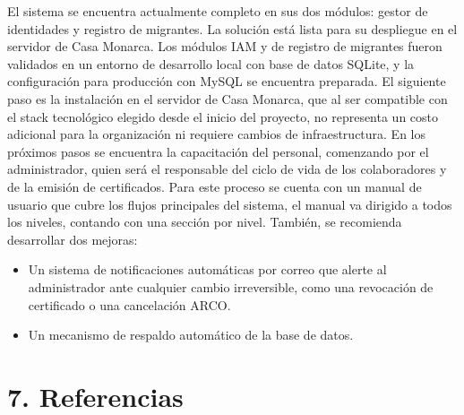 \documentclass[10pt,letterpaper]{report}
\begin{document}
El sistema se encuentra actualmente completo en sus dos módulos: gestor de identidades y registro de migrantes. La solución está lista para su despliegue en el servidor de Casa Monarca. Los módulos IAM y de registro de migrantes fueron validados en un entorno de desarrollo local con base de datos SQLite, y la configuración para producción con MySQL se encuentra preparada. El siguiente paso es la instalación en el servidor de Casa Monarca, que al ser compatible con el stack tecnológico elegido desde el inicio del proyecto, no representa un costo adicional para la organización ni requiere cambios de infraestructura.
En los próximos pasos se encuentra la capacitación del personal, comenzando por el administrador, quien será el responsable del ciclo de vida de los colaboradores y de la emisión de certificados. Para este proceso se cuenta con un manual de usuario que cubre los flujos principales del sistema, el manual va dirigido a todos los niveles, contando con una sección por nivel. También, se recomienda desarrollar dos mejoras: 
\begin{itemize}[leftmargin=*]
    \item Un sistema de notificaciones automáticas por correo que alerte al administrador ante cualquier cambio irreversible, como una revocación de certificado o una cancelación ARCO.
    \item Un mecanismo de respaldo automático de la base de datos.
\end{itemize}

 
\section*{7. Referencias}
 
\end{document}
